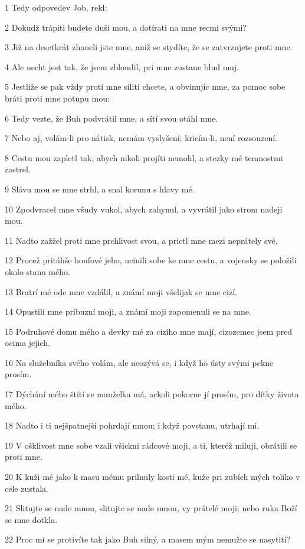 \par 1 Tedy odpovedev Job, rekl:
\par 2 Dokudž trápiti budete duši mou, a dotírati na mne recmi svými?
\par 3 Již na desetkrát zhaneli jste mne, aniž se stydíte, že se zatvrzujete proti mne.
\par 4 Ale necht jest tak, že jsem zbloudil, pri mne zustane blud muj.
\par 5 Jestliže se pak vždy proti mne siliti chcete, a obvinujíc mne, za pomoc sobe bráti proti mne potupu mou:
\par 6 Tedy vezte, že Buh podvrátil mne, a sítí svou otáhl mne.
\par 7 Nebo aj, volám-li pro nátisk, nemám vyslyšení; kricím-li, není rozsouzení.
\par 8 Cestu mou zapletl tak, abych nikoli projíti nemohl, a stezky mé temnostmi zastrel.
\par 9 Slávu mou se mne strhl, a snal korunu s hlavy mé.
\par 10 Zpodvracel mne všudy vukol, abych zahynul, a vyvrátil jako strom nadeji mou.
\par 11 Nadto zažžel proti mne prchlivost svou, a prictl mne mezi neprátely své.
\par 12 Procež pritáhše houfové jeho, ucinili sobe ke mne cestu, a vojensky se položili okolo stanu mého.
\par 13 Bratrí mé ode mne vzdálil, a známí moji všelijak se mne cizí.
\par 14 Opustili mne príbuzní moji, a známí moji zapomenuli se na mne.
\par 15 Podruhové domu mého a devky mé za cizího mne mají, cizozemec jsem pred ocima jejich.
\par 16 Na služebníka svého volám, ale neozývá se, i když ho ústy svými pekne prosím.
\par 17 Dýchání mého štítí se manželka má, ackoli pokorne jí prosím, pro dítky života mého.
\par 18 Nadto i ti nejšpatnejší pohrdají mnou; i když povstanu, utrhají mi.
\par 19 V ošklivost mne sobe vzali všickni rádcové moji, a ti, kteréž miluji, obrátili se proti mne.
\par 20 K kuži mé jako k masu mému prilnuly kosti mé, kuže pri zubích mých toliko v cele zustala.
\par 21 Slitujte se nade mnou, slitujte se nade mnou, vy prátelé moji; nebo ruka Boží se mne dotkla.
\par 22 Proc mi se protivíte tak jako Buh silný, a masem mým nemužte se nasytiti?
